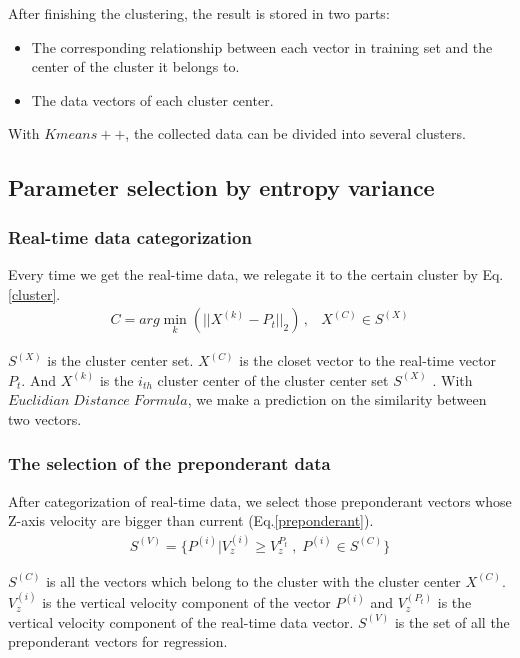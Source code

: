 After finishing the clustering, the result is stored in two parts:

\begin{itemize}
	\item The corresponding relationship between each vector in training set and the center of the cluster it belongs to.
	\item The data vectors of each cluster center.
\end{itemize}

With $Kmeans++$, the collected data can be divided into several clusters.

\subsection{Parameter selection by entropy variance}

\subsubsection{Real-time data categorization}

Every time we get the real-time data, we relegate it to the certain cluster by Eq.\ref{cluster}.
\begin{eqnarray}\label{cluster}
C=arg\min \limits_{k}{(||X^{(k)}-P_{t}||_{2})} \, ,&X^{(C)}\in S^{(X)}
\end{eqnarray}

$S^{(X)}$ is the cluster center set. $X^{(C)}$ is the closet vector to the real-time vector $P_t$. And $X^{(k)}$ is the $i_{th}$ cluster center of the cluster center set $S^{(X)}$ . With $Euclidian \; Distance \; Formula$, we make a prediction on the similarity between two vectors.

\subsubsection{The selection of the preponderant data}

After categorization of real-time data, we select those preponderant vectors whose Z-axis velocity are bigger than current (Eq.\ref{preponderant}).
\begin{eqnarray}\label{preponderant}
S^{(V)}=\{P^{(i)}|V_{z}^{(i)}\geq V_{z}^{P_{t}} \; , \; P^{(i)}\in S^{(C)}\}
\end{eqnarray}

$S^{(C)}$ is all the vectors which belong to the cluster with the cluster center $X^{(C)}$. $V_{z}^{(i)}$ is the vertical velocity component of the vector $P^{(i)}$ and $V_{z}^{(P_{t})}$ is the vertical velocity component of the real-time data vector. $S^{(V)}$ is the set of all the preponderant vectors for regression.

